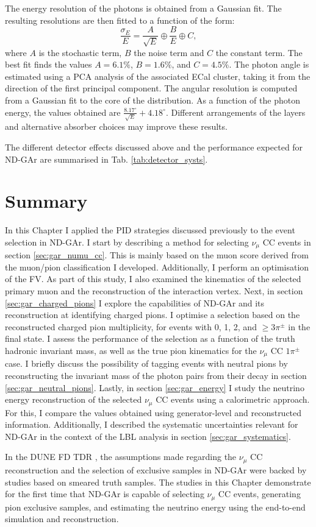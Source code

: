 The energy resolution of the photons is obtained from a Gaussian fit. The resulting resolutions are then fitted to a function of the form:
\begin{equation}
    \frac{\sigma_{E}}{E} = \frac{A}{\sqrt{E}} \oplus \frac{B}{E} \oplus C,
\end{equation}
where $A$ is the stochastic term, $B$ the noise term and $C$ the constant term. The best fit finds the values $A=6.1\%$, $B=1.6\%$, and $C=4.5\%$. The photon angle is estimated using a PCA analysis of the associated ECal cluster, taking it from the direction of the first principal component. The angular resolution is computed from a Gaussian fit to the core of the distribution. As a function of the photon energy, the values obtained are $\frac{8.17^{\circ}}{\sqrt{E}} + 4.18^{\circ}$. Different arrangements of the layers and alternative absorber choices may improve these results.

The different detector effects discussed above and the performance expected for ND-GAr are summarised in Tab. \ref{tab:detector_systs}.

\section{Summary}

In this Chapter I applied the PID strategies discussed previously to the event selection in ND-GAr. I start by describing a method for selecting $\nu_{\mu}$ CC events in section \ref{sec:gar_numu_cc}. This is mainly based on the muon score derived from the muon/pion classification I developed. Additionally, I perform an optimisation of the FV. As part of this study, I also examined the kinematics of the selected primary muon and the reconstruction of the interaction vertex. Next, in section \ref{sec:gar_charged_pions} I explore the capabilities of ND-GAr and its reconstruction at identifying charged pions. I optimise a selection based on the reconstructed charged pion multiplicity, for events with 0, 1, 2, and $\geq 3 \pi^{\pm}$ in the final state. I assess the performance of the selection as a function of the truth hadronic invariant mass, as well as the true pion kinematics for the $\nu_{\mu}$ CC $1\pi^{\pm}$ case. I briefly discuss the possibility of tagging events with neutral pions by reconstructing the invariant mass of the photon pairs from their decay in section \ref{sec:gar_neutral_pions}. Lastly, in section \ref{sec:gar_energy} I study the neutrino energy reconstruction of the selected $\nu_{\mu}$ CC events using a calorimetric approach. For this, I compare the values obtained using generator-level and reconstructed information. Additionally, I described the systematic uncertainties relevant for ND-GAr in the context of the LBL analysis in section \ref{sec:gar_systematics}.

In the DUNE FD TDR \cite{DUNE2020TDR2}, the assumptions made regarding the $\nu_{\mu}$ CC reconstruction and the selection of exclusive samples in ND-GAr were backed by studies based on smeared truth samples. The studies in this Chapter demonstrate for the first time that ND-GAr is capable of selecting $\nu_{\mu}$ CC events, generating pion exclusive samples, and estimating the neutrino energy using the end-to-end simulation and reconstruction.